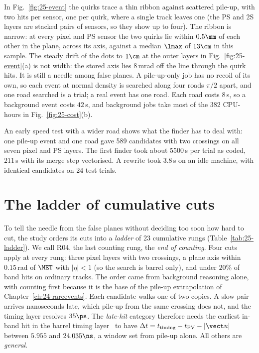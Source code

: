 In Fig.~\ref{fig:25-event} the quirks trace a thin ribbon against scattered pile-up, with two hits per sensor, one per quirk, where a
single track leaves one (the PS and 2S layers are stacked pairs of sensors, so they show up to four). The ribbon is narrow: at every pixel and PS sensor the two quirks lie within $0.5\mm$ of each other in the plane, across its axis, against a median $\lmax$ of $13\cm$ in this sample. The steady drift of the dots to $1\cm$ at the outer layers in Fig.~\ref{fig:25-event}(a) is not width: the stored axis lies $8$\,mrad off the line through the quirk hits. It is still a needle among false planes.
A pile-up-only job has no recoil of its own, so each event at normal density is searched along four roads $\pi/2$ apart, and one road searched is a trial; a real event has one road.
Each road
costs $8$\,s, so a background event costs $42$\,s, and background jobs take most of the $382$ CPU-hours in
Fig.~\ref{fig:25-cost}(b).

An early speed test with a wider road shows what the finder has to deal with: one pile-up event and one road gave 589 candidates with two crossings on all seven pixel and PS layers. The first finder took about $5500$\,s per trial as coded, $211$\,s with its merge step vectorised. A rewrite took
$3.8$\,s on an idle machine, with identical candidates on 24 test trials.

\section{The ladder of cumulative cuts}\label{sec:25-ladder}

To tell the needle from the false planes without deciding too soon how hard to cut, the study orders its cuts into a
\emph{ladder} of 23 cumulative rungs (Table~\ref{tab:25-ladder}). We call R04, the last counting rung, the \emph{end of counting}. Four cuts apply at every rung: three
pixel layers with two crossings, a plane axis within $0.15$\,rad of $\MET$ with $|\eta|<1$ (so the search is barrel only), and under $20\%$ of
band hits on ordinary tracks. The order came from background reasoning alone, with counting first because it is the base of the pile-up
extrapolation of Chapter~\ref{ch:24-rareevents}. Each candidate walks one of two copies. A slow pair
arrives nanoseconds late, which pile-up from the same crossing does not, and the timing layer resolves $35\ps$. The \emph{late-hit} category
therefore needs the earliest in-band hit in the barrel timing layer~\cite{Butler:2019rpu} to have $\Delta t=t_{\rm timing}-t_{\rm PV}-|\vect u|$ between $5.955$
and $24.035\ns$, a window set from pile-up alone. All others are \emph{general}.

